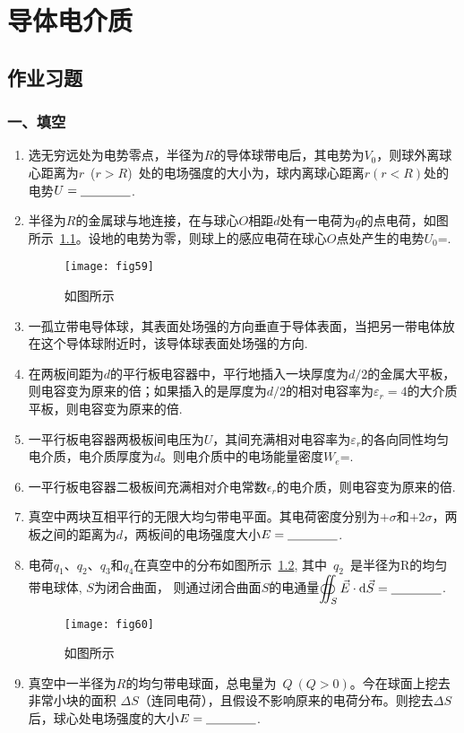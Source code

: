 \chapter{导体电介质}
\section{作业习题}
\subsection*{一、填空}
\begin{enumerate}
    \item 选无穷远处为电势零点，半径为$R$的导体球带电后，其电势为$V_0$，则球外离球心距离为$r$~($r>R$)~处的电场强度的大小为\nl，球内离球心距离$r(r<R)$处的电势$U=\nl$.
    \item 半径为$R$的金属球与地连接，在与球心$O$相距$d$处有一电荷为$q$的点电荷，如图所示~\ref{fig:59}。设地的电势为零，则球上的感应电荷在球心$O$点处产生的电势$U_0$=\nl.    
    \begin{figure}[H]
        \centering
        \texttt{[image: fig59]}
        \caption{如图所示}\label{fig:59}
    \end{figure}
    \item 一孤立带电导体球，其表面处场强的方向垂直于导体表面，当把另一带电体放在这个导体球附近时，该导体球表面处场强的方向\nl.
    \item 在两板间距为$d$的平行板电容器中，平行地插入一块厚度为$d/2$的金属大平板，则电容变为原来的\nl 倍；如果插入的是厚度为$d/2$的相对电容率为$\varepsilon_r = 4$的大介质平板，则电容变为原来的\nl 倍.
    \item 一平行板电容器两极板间电压为$U$，其间充满相对电容率为$\varepsilon_r$的各向同性均匀电介质，电介质厚度为$d$。则电介质中的电场能量密度$W_e$=\nl.
    \item 一平行板电容器二极板间充满相对介电常数$\epsilon_r$的电介质，则电容变为原来的\underline{\makebox[3em]{}}倍.
    \item 真空中两块互相平行的无限大均匀带电平面。其电荷密度分别为$+\sigma$和$+2\sigma$，两板之间的距离为$d$，两板间的电场强度大小$E=\nl$.
    \item 电荷$q_1$、$q_2$、$q_3$和$q_4$在真空中的分布如图所示~\ref{fig:60}, 
    其中~$q_2$~是半径为R的均匀带电球体, $S$为闭合曲面，
    则通过闭合曲面$S$的电通量$\displaystyle{\oiint_S {\vec{E}\cdot \mathrm{d}\vec{S}}=\nl}$.
    \begin{figure}[H]
        \centering
        \texttt{[image: fig60]}
        \caption{如图所示}\label{fig:60}
    \end{figure}
    \item 真空中一半径为$R$的均匀带电球面，总电量为~$Q~(Q>0)$。今在球面上挖去非常小块的面积 $\Delta S$（连同电荷），且假设不影响原来的电荷分布。则挖去$\Delta S$后，球心处电场强度的大小$E=\nl$.
\end{enumerate}
